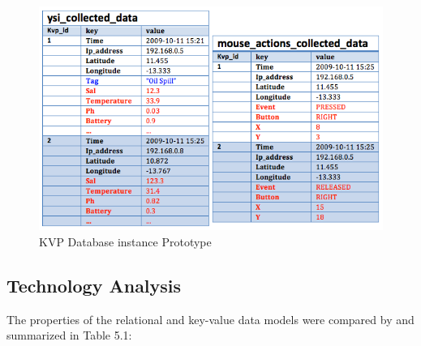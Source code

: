 \begin{figure}[!h]
  \centering
  \includegraphics[scale=0.5]{../diagrams/persistence-example-kvp}
  \caption{KVP Database instance Prototype}
  \label{fig:persistence-example-kvp}
\end{figure}

\subsection{Technology Analysis}

The properties of the relational and key-value data models were compared by
\cite{db-is-rdbs-dommed} and summarized in Table 5.1:


